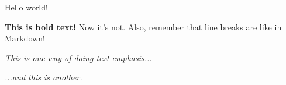 \documentclass{article}
\begin{document}
Hello world!


{\bf This is bold text!} Now it's not.
Also, remember that line breaks are like in Markdown!

\emph{This is one way of doing text emphasis...}

{\em ...and this is another.}
\end{document}
